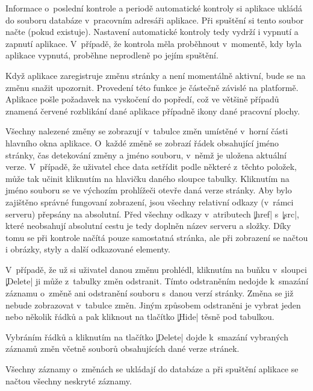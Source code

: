 Informace o~poslední kontrole a periodě automatické kontroly si aplikace ukládá do souboru databáze v~pracovním adresáři aplikace.
Při spuštění si tento soubor načte (pokud existuje).
Nastavení automatické kontroly tedy vydrží i vypnutí a zapnutí aplikace.
V~případě, že kontrola měla proběhnout v~momentě, kdy byla aplikace vypnutá, proběhne neprodleně po jejím spuštění.

Když aplikace zaregistruje změnu stránky a není momentálně aktivní, bude se na změnu snažit upozornit.
Provedení této funkce je částečně závislé na platformě. 
Aplikace pošle požadavek na vyskočení do popředí, což ve většině případů znamená červené rozblikání dané aplikace případně ikony dané pracovní plochy.

Všechny nalezené změny se zobrazují v~tabulce změn umístěné v~horní části hlavního okna aplikace.
O~každé změně se zobrazí řádek obsahující jméno stránky, čas detekování změny a jméno souboru, v~němž je uložena aktuální verze.
V~případě, že uživatel chce data setřídit podle některé z~těchto položek, může tak učinit kliknutím na hlavičku daného sloupce tabulky.
Kliknutím na jméno souboru se ve výchozím prohlížeči otevře daná verze stránky.
Aby bylo zajištěno správné fungovaní zobrazení, jsou všechny relativní odkazy (v~rámci serveru) přepsány na absolutní.
Před všechny odkazy v~atributech \c|href| s~\c|src|, které neobsahují absolutní cestu je tedy doplněn název serveru a složky.
Díky tomu se při kontrole načítá pouze samostatná stránka, ale při zobrazení se načtou i obrázky, styly a další odkazované elementy.

V~případě, že už si uživatel danou změnu prohlédl, kliknutím na buňku v~sloupci \c|Delete| ji může z~tabulky změn odstranit.
Tímto odstraněním nedojde k~smazání záznamu o~změně ani odstranění souboru s~danou verzí stránky.
Změna se již nebude zobrazovat v~tabulce změn.
Jiným způsobem odstraněni je vybrat jeden nebo několik řádků a pak kliknout na tlačítko \c|Hide| těsně pod tabulkou.

Vybráním řádků a kliknutím na tlačítko \c|Delete| dojde k~smazání vybraných záznamů změn včetně souborů obsahujících dané verze stránek.

Všechny záznamy o~změnách se ukládají do databáze a při spuštění aplikace se načtou všechny neskryté záznamy. 
